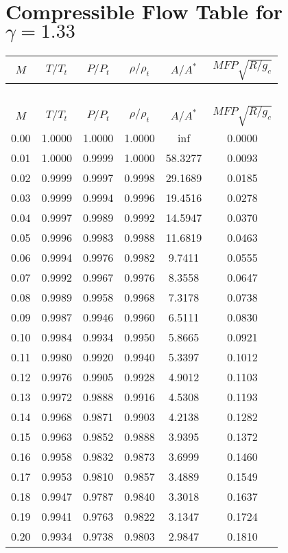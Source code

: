 \documentclass{article}
\begin{document}
\section*{Compressible Flow Table for $\gamma = 1.33$}
\begin{longtable}{cccccc}  %

\toprule
$M$ & $T/T_t$ & $P/P_t$ & $\rho/\rho_t$ & $A/A^*$ & $MFP\sqrt{R/g_c}$ \\
\midrule
\endfirsthead
\multicolumn{6}{c}{~} \\
\toprule
$M$ & $T/T_t$ & $P/P_t$ & $\rho/\rho_t$ & $A/A^*$ & $MFP\sqrt{R/g_c}$ \\
\midrule
\endhead
0.00 & 1.0000 & 1.0000 & 1.0000 & inf & 0.0000 \\
0.01 & 1.0000 & 0.9999 & 1.0000 & 58.3277 & 0.0093 \\
0.02 & 0.9999 & 0.9997 & 0.9998 & 29.1689 & 0.0185 \\
0.03 & 0.9999 & 0.9994 & 0.9996 & 19.4516 & 0.0278 \\
0.04 & 0.9997 & 0.9989 & 0.9992 & 14.5947 & 0.0370 \\
0.05 & 0.9996 & 0.9983 & 0.9988 & 11.6819 & 0.0463 \\
0.06 & 0.9994 & 0.9976 & 0.9982 & 9.7411 & 0.0555 \\
0.07 & 0.9992 & 0.9967 & 0.9976 & 8.3558 & 0.0647 \\
0.08 & 0.9989 & 0.9958 & 0.9968 & 7.3178 & 0.0738 \\
0.09 & 0.9987 & 0.9946 & 0.9960 & 6.5111 & 0.0830 \\
0.10 & 0.9984 & 0.9934 & 0.9950 & 5.8665 & 0.0921 \\
0.11 & 0.9980 & 0.9920 & 0.9940 & 5.3397 & 0.1012 \\
0.12 & 0.9976 & 0.9905 & 0.9928 & 4.9012 & 0.1103 \\
0.13 & 0.9972 & 0.9888 & 0.9916 & 4.5308 & 0.1193 \\
0.14 & 0.9968 & 0.9871 & 0.9903 & 4.2138 & 0.1282 \\
0.15 & 0.9963 & 0.9852 & 0.9888 & 3.9395 & 0.1372 \\
0.16 & 0.9958 & 0.9832 & 0.9873 & 3.6999 & 0.1460 \\
0.17 & 0.9953 & 0.9810 & 0.9857 & 3.4889 & 0.1549 \\
0.18 & 0.9947 & 0.9787 & 0.9840 & 3.3018 & 0.1637 \\
0.19 & 0.9941 & 0.9763 & 0.9822 & 3.1347 & 0.1724 \\
0.20 & 0.9934 & 0.9738 & 0.9803 & 2.9847 & 0.1810 \\

\end{longtable}
\end{document}
